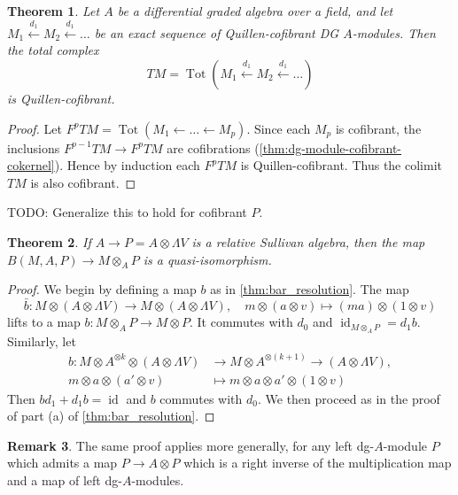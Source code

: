 \documentclass{scrartcl}
\theoremstyle{plain}
\newtheorem{theorem}{Theorem}[section]
\theoremstyle{definition}
\newtheorem{remark}[theorem]{Remark}
\DeclareMathOperator{\Tot}{Tot}
\newcommand{\from}{\leftarrow}
\let\xfrom\xleftarrow
\DeclareMathOperator{\id}{id}
\begin{document}
\begin{theorem}\label{thm:cofibrant-resolution-dga-mod}
    Let $A$ be a differential graded algebra over a field, and let $M_1\xfrom{d_1} M_2\xfrom{d_1}\dots$ be an exact sequence of Quillen-cofibrant DG $A$-modules. Then the total complex $$TM=\Tot(M_1\xfrom{d_1} M_2\xfrom{d_1} \dots)$$ is Quillen-cofibrant.
\end{theorem}

\begin{proof}
    Let $F^pTM = \Tot(M_1\from\dots\from M_p)$. Since each $M_p$ is cofibrant, the inclusions $F^{p-1}TM \to F^pTM$ are cofibrations (\ref{thm:dg-module-cofibrant-cokernel}). Hence by induction each $F^pTM$ is Quillen-cofibrant. Thus the colimit $TM$ is also cofibrant. 
\end{proof}

TODO: Generalize this to hold for cofibrant $P$. 
\begin{theorem}\label{thm:bar-resolution-sullivan}
    If $A\to P = A\otimes \Lambda V$ is a relative Sullivan algebra, then the map $B(M, A, P) \to M\otimes_A P$ is a quasi-isomorphism.
\end{theorem}
\begin{proof}
    We begin by defining a map $b$ as in \ref{thm:bar_resolution}. The map $$\bar b \colon M\otimes (A\otimes \Lambda V) \to M\otimes (A\otimes \Lambda V),\quad m\otimes (a\otimes v)\mapsto (ma)\otimes (1\otimes v)$$ lifts to a map $b\colon M\otimes_A P\to M\otimes P$. It commutes with $d_0$ and $\id_{M\otimes_A P} = d_1 b$. Similarly, let 
    \begin{align*}
        b\colon M\otimes A^{\otimes k} \otimes (A\otimes \Lambda V)&\to M\otimes A^{\otimes (k+1)} \to (A\otimes \Lambda V), \\
        m\otimes a \otimes (a'\otimes v) &\mapsto m\otimes a \otimes a' \otimes (1\otimes v)
    \end{align*}
    Then $b d_1 + d_1 b = \id$ and $b$ commutes with $d_0$. We then proceed as in the proof of part (a) of \ref{thm:bar_resolution}. 
\end{proof}
\begin{remark}
    The same proof applies more generally, for any left dg-$A$-module $P$ which admits a map $P\to A\otimes P$ which is a right inverse of the multiplication map and a map of left dg-$A$-modules.
\end{remark}
\end{document}
